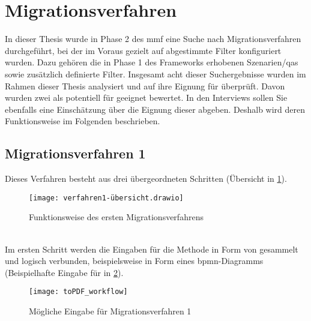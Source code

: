 \section{Migrationsverfahren}

In dieser Thesis wurde in Phase 2 des \gls{mmf} eine Suche nach Migrationsverfahren durchgeführt, bei der im Voraus gezielt auf \jf abgestimmte Filter konfiguriert wurden.
Dazu gehören die in Phase 1 des Frameworks erhobenen Szenarien/\glspl{qa} sowie zusätzlich definierte Filter.
Insgesamt acht dieser Suchergebnisse wurden im Rahmen dieser Thesis analysiert und auf ihre Eignung für \jf überprüft.
Davon wurden zwei als potentiell für \jf geeignet bewertet.
In den Interviews sollen Sie ebenfalls eine Einschätzung über die Eignung dieser abgeben.
Deshalb wird deren Funktionsweise im Folgenden beschrieben.

\subsection{Migrationsverfahren 1}

Dieses Verfahren besteht aus drei übergeordneten Schritten (Übersicht in \cref{fig:interviews-migrationsverfahren1}).
\begin{figure}[!ht]
	\centering
	\texttt{[image: verfahren1-übersicht.drawio]}
	\caption[Funktionsweise Migrationsverfahren 1]{
		Funktionsweise des ersten Migrationsverfahrens
	}
	\label{fig:interviews-migrationsverfahren1}
\end{figure} \\
Im ersten Schritt werden die Eingaben für die Methode in Form von  gesammelt und logisch verbunden, beispielsweise in Form eines \gls{bpmn}-Diagramms (Beispielhafte Eingabe für \jf in \cref{fig:interview-eingabe-verfahren1}).

\begin{figure}[!ht]
	\centering
	\texttt{[image: toPDF\_workflow]}
	\caption[Mögliche Eingabe Migrationsverfahren 1]{
		Mögliche Eingabe für Migrationsverfahren 1
	}
	\label{fig:interview-eingabe-verfahren1}
\end{figure}

